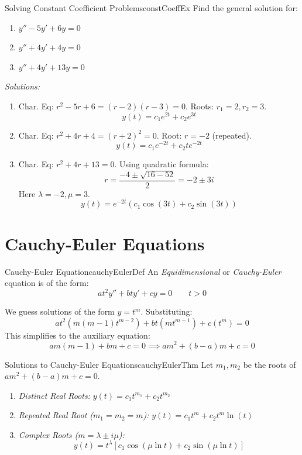 \documentclass{book}
\begin{document}
\begin{example}{Solving Constant Coefficient Problems}{constCoeffEx}
    Find the general solution for:
    \begin{enumerate}
        \item $y'' - 5y' + 6y = 0$
        \item $y'' + 4y' + 4y = 0$
        \item $y'' + 4y' + 13y = 0$
    \end{enumerate}
    \emph{Solutions:}
    \begin{enumerate}
        \item Char. Eq: $r^2 - 5r + 6 = (r-2)(r-3) = 0$. Roots: $r_1=2, r_2=3$.
        \[ y(t) = c_1 e^{2t} + c_2 e^{3t} \]
        \item Char. Eq: $r^2 + 4r + 4 = (r+2)^2 = 0$. Root: $r=-2$ (repeated).
        \[ y(t) = c_1 e^{-2t} + c_2 t e^{-2t} \]
        \item Char. Eq: $r^2 + 4r + 13 = 0$. Using quadratic formula:
        \[ r = \frac{-4 \pm \sqrt{16 - 52}}{2} = -2 \pm 3i \]
        Here $\lambda = -2, \mu = 3$.
        \[ y(t) = e^{-2t}(c_1 \cos(3t) + c_2 \sin(3t)) \]
    \end{enumerate}
\end{example}

\section{Cauchy-Euler Equations}

\begin{defn}{Cauchy-Euler Equation}{cauchyEulerDef}
    An \emph{Equidimensional} or \emph{Cauchy-Euler} equation is of the form:
    \[
        at^2 y'' + bty' + cy = 0 \qquad t > 0
    \]
\end{defn}

We guess solutions of the form $y = t^m$. Substituting:
\[
    at^2(m(m-1)t^{m-2}) + bt(mt^{m-1}) + c(t^m) = 0
\]
This simplifies to the auxiliary equation:
\[
    am(m-1) + bm + c = 0 \implies am^2 + (b-a)m + c = 0
\]

\begin{thm}{Solutions to Cauchy-Euler Equations}{cauchyEulerThm}
    Let $m_1, m_2$ be the roots of $am^2 + (b-a)m + c = 0$.
    \begin{enumerate}
        \item \emph{Distinct Real Roots:} $y(t) = c_1 t^{m_1} + c_2 t^{m_2}$
        \item \emph{Repeated Real Root ($m_1=m_2=m$):} $y(t) = c_1 t^m + c_2 t^m \ln(t)$
        \item \emph{Complex Roots ($m = \lambda \pm i\mu$):}
        \[ y(t) = t^\lambda \left[ c_1 \cos(\mu \ln t) + c_2 \sin(\mu \ln t) \right] \]
    \end{enumerate}
\end{thm}
\end{document}
